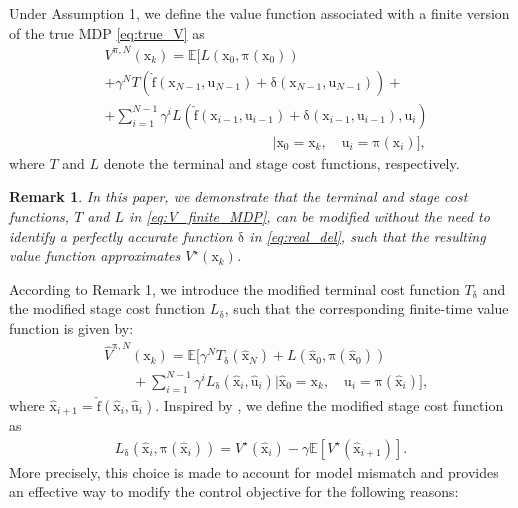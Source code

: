 \documentclass[10pt,twocolumn,twoside]{IEEEtran}
\newcommand{\vect}[1]{\ensuremath{\boldsymbol{\mathrm{#1}}}}
\newtheorem{Remark}{Remark}
\begin{document}
Under Assumption 1, we define the value function associated with a finite version of the true MDP \eqref{eq:true_V} as
\begin{align}\label{eq:V_finite_MDP}
    &V^{\vect\pi,N}\left(\vect x_k\right)=\mathbb{E}\Bigg[L\left(\vect x_0,\vect\pi\left(\vect x_0\right)\right)\\\nonumber
    &+\gamma^N T\left(\vect{\hat f}(\vect x_{N-1},\vect u_{N-1})+\vect\delta\left(\vect x_{N-1},\vect u_{N-1}\right)\right)+\\\nonumber
    &+\sum_{i=1}^{N-1}\gamma^i L\left(\vect{\hat f}(\vect x_{i-1},\vect u_{i-1})+ \vect\delta\left(\vect x_{i-1},\vect u_{i-1}\right),\vect u_i\right)\\\nonumber
    &\qquad\qquad\qquad\qquad\qquad\qquad\Big|\vect x_0=\vect x_k,\quad \vect u_i=\vect\pi\left(\vect x_i\right)\Bigg],
\end{align}
where $T$ and $L$ denote the terminal and stage cost functions, respectively.
\begin{Remark}
    In this paper, we demonstrate that the terminal and stage cost functions, $T$ and $L$ in \eqref{eq:V_finite_MDP}, can be modified without the need to identify a perfectly accurate function $\vect\delta$ in \eqref{eq:real_del}, such that the resulting value function approximates $V^\star\left(\vect x_k\right)$.
\end{Remark}
According to Remark 1, we introduce the modified terminal cost function $T_{\vect\delta}$ and the modified stage cost function $L_{\vect\delta}$, such that the corresponding finite-time value function is given by:
\begin{align}\label{eq:modif_V_finite}
    &\hat V^{\vect\pi,N}\left(\vect x_k\right)=\mathbb{E}\Bigg[\gamma^N T_{\vect\delta}\left(\vect {\hat x}_N\right)+L\left(\hat{\vect {x}}_0,\vect\pi\left(\hat{\vect {x}}_0\right)\right)\\\nonumber
    &\qquad+\sum_{i=1}^{N-1}\gamma^i L_{\vect\delta}\left(\vect {\hat x}_{i},\vect {\hat u}_{i}\right)\Big|\hat{\vect {x}}_0=\vect x_k,\quad \hat{\vect {u}}_i=\vect\pi\left(\hat{\vect {x}}_i\right)\Bigg],
\end{align}
where $\vect {\hat x}_{i+1}=\vect{\hat f}(\vect {\hat x}_{i},\vect {\hat u}_{i})$. Inspired by \cite{10808167}, we define the modified stage cost function as
\begin{align}\label{eq:modif_L}
     L_{\vect{\delta}}(\hat{\vect{x}}_i, \vect{\pi}(\hat{\vect{x}}_i)) = V^\star(\hat{\vect{x}}_i) - \gamma \mathbb{E}[V^\star(\hat{\vect{x}}_{i+1})].
\end{align}
More precisely, this choice is made to account for model mismatch and provides an effective way to modify the control objective for the following reasons:
\end{document}
